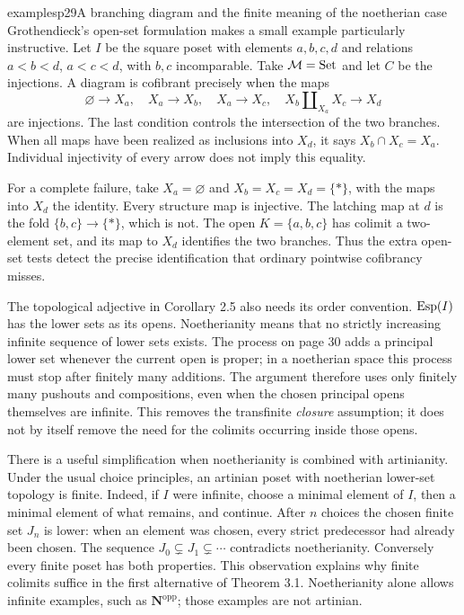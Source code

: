 

\begin{dcomment}{examples}{p29}{A branching diagram and the finite meaning of the noetherian case}
Grothendieck's open-set formulation makes a small example particularly instructive. Let $I$ be the square poset with elements $a,b,c,d$ and relations $a<b<d$, $a<c<d$, with $b,c$ incomparable. Take $\mathcal{M}=\mathrm{Set}$ and let $C$ be the injections. A diagram is cofibrant precisely when the maps
\[
 \varnothing\longrightarrow X_a,\quad
 X_a\longrightarrow X_b,\quad X_a\longrightarrow X_c,\quad
 X_b\amalg_{X_a}X_c\longrightarrow X_d
\]
are injections. The last condition controls the intersection of the two branches. When all maps have been realized as inclusions into $X_d$, it says $X_b\cap X_c=X_a$. Individual injectivity of every arrow does not imply this equality.

For a complete failure, take $X_a=\varnothing$ and $X_b=X_c=X_d=\{*\}$, with the maps into $X_d$ the identity. Every structure map is injective. The latching map at $d$ is the fold $\{b,c\}\to\{*\}$, which is not. The open $K=\{a,b,c\}$ has colimit a two-element set, and its map to $X_d$ identifies the two branches. Thus the extra open-set tests detect the precise identification that ordinary pointwise cofibrancy misses.

The topological adjective in Corollary 2.5 also needs its order convention. $\operatorname{Esp}(I)$ has the lower sets as its opens. Noetherianity means that no strictly increasing infinite sequence of lower sets exists. The process on page 30 adds a principal lower set whenever the current open is proper; in a noetherian space this process must stop after finitely many additions. The argument therefore uses only finitely many pushouts and compositions, even when the chosen principal opens themselves are infinite. This removes the transfinite \emph{closure} assumption; it does not by itself remove the need for the colimits occurring inside those opens.

There is a useful simplification when noetherianity is combined with artinianity. Under the usual choice principles, an artinian poset with noetherian lower-set topology is finite. Indeed, if $I$ were infinite, choose a minimal element of $I$, then a minimal element of what remains, and continue. After $n$ choices the chosen finite set $J_n$ is lower: when an element was chosen, every strict predecessor had already been chosen. The sequence $J_0\subsetneq J_1\subsetneq\cdots$ contradicts noetherianity. Conversely every finite poset has both properties. This observation explains why finite colimits suffice in the first alternative of Theorem 3.1. Noetherianity alone allows infinite examples, such as $\mathbf N^{\mathrm{opp}}$; those examples are not artinian.
\end{dcomment}


